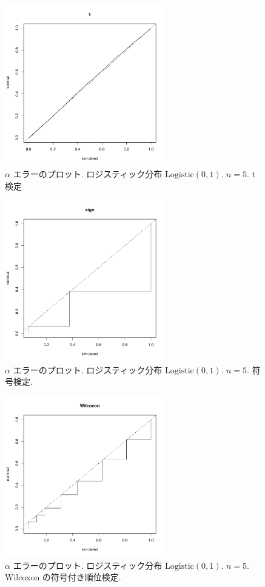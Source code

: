 \documentclass[12pt]{jsarticle}
\begin{document}
\begin{figure}[htbp]
  \begin{center}
\includegraphics[width=70mm]{img/pv_logis_5_t.pdf}
  \end{center}
     \caption{$\alpha$ エラーのプロット. ロジスティック分布 $\mathrm{Logistic}(0,1)$. $n=5$. t 検定}
  \label{fig_pv_logis_5_t}
 \end{figure}
 
 \begin{figure}[htbp]
 \begin{center}
  \includegraphics[width=70mm]{img/pv_logis_5_sign.pdf}
 \end{center}
      \caption{$\alpha$ エラーのプロット. ロジスティック分布 $\mathrm{Logistic}(0,1)$. $n=5$. 符号検定.}
     \end{figure}  

 \begin{figure}[htbp]
 \begin{center}
  \includegraphics[width=70mm]{img/pv_logis_5_wilco.pdf}
 \end{center}
       \caption{$\alpha$ エラーのプロット. ロジスティック分布 $\mathrm{Logistic}(0,1)$. $n=5$. Wilcoxon の符号付き順位検定.}
  \label{fig_pv_logis_5_wilco}
\end{figure}
\end{document}
